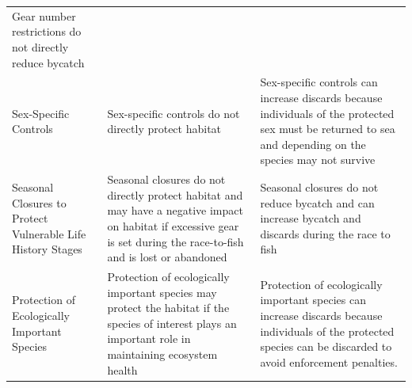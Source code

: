 \documentclass[]{book}
\begin{document}
\begin{longtable}[]{@{}lll@{}}
\begin{minipage}[t]{0.30\columnwidth}
Gear number restrictions do not directly reduce bycatch\strut
\end{minipage}\tabularnewline
\begin{minipage}[t]{0.30\columnwidth}\raggedright\strut
Sex-Specific Controls\strut
\end{minipage} & \begin{minipage}[t]{0.30\columnwidth}\raggedright\strut
Sex-specific controls do not directly protect habitat\strut
\end{minipage} & \begin{minipage}[t]{0.30\columnwidth}\raggedright\strut
Sex-specific controls can increase discards because individuals of the
protected sex must be returned to sea and depending on the species may
not survive\strut
\end{minipage}\tabularnewline
\begin{minipage}[t]{0.30\columnwidth}\raggedright\strut
Seasonal Closures to Protect Vulnerable Life History Stages\strut
\end{minipage} & \begin{minipage}[t]{0.30\columnwidth}\raggedright\strut
Seasonal closures do not directly protect habitat and may have a
negative impact on habitat if excessive gear is set during the
race-to-fish and is lost or abandoned\strut
\end{minipage} & \begin{minipage}[t]{0.30\columnwidth}\raggedright\strut
Seasonal closures do not reduce bycatch and can increase bycatch and
discards during the race to fish\strut
\end{minipage}\tabularnewline
\begin{minipage}[t]{0.30\columnwidth}\raggedright\strut
Protection of Ecologically Important Species\strut
\end{minipage} & \begin{minipage}[t]{0.30\columnwidth}\raggedright\strut
Protection of ecologically important species may protect the habitat if
the species of interest plays an important role in maintaining ecosystem
health\strut
\end{minipage} & \begin{minipage}[t]{0.30\columnwidth}\raggedright\strut
Protection of ecologically important species can increase discards
because individuals of the protected species can be discarded to avoid
enforcement penalties.\strut
\end{minipage}\tabularnewline
\bottomrule
\end{longtable}
\end{document}
